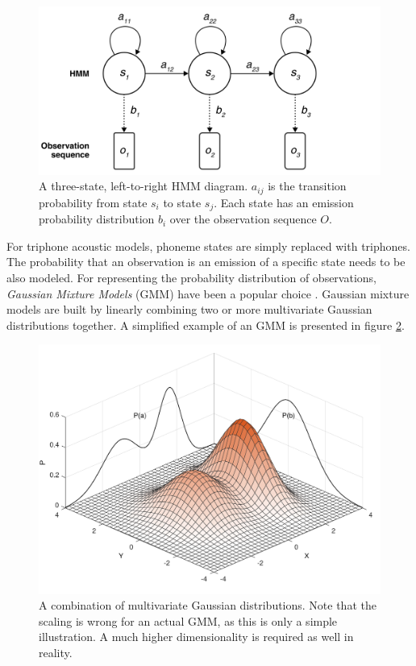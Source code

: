 \documentclass[english, 12pt, a4paper, pdftex, elec, utf8]{aaltothesis}
\begin{document}
\begin{figure}[h!]
	\centering
	\includegraphics[width=\textwidth]{hmm.pdf}
	\caption{A three-state, left-to-right HMM diagram. $a_{ij}$ is the transition probability from state $s_i$ to state $s_j$. Each state has an emission probability distribution $b_i$ over the observation sequence $O$.}
	\label{fig:hmm} 
\end{figure}
For triphone acoustic models, phoneme states are simply replaced with triphones. The probability that an observation is an emission of a specific state needs to be also modeled. For representing the probability distribution of observations, \textit{Gaussian Mixture Models} (GMM) have been a popular choice \cite{gales2008application, hinton2012deep}. Gaussian mixture models are built by linearly combining two or more multivariate Gaussian distributions together. A simplified example of an GMM is presented in figure \ref{fig:gmm}.
\begin{figure}[b]
	\centering
	\includegraphics[trim={0cm 0.2cm 0cm 0.2cm}, clip, width=\textwidth]{gmm.pdf}
	\caption{A combination of multivariate Gaussian distributions. Note that the scaling is wrong for an actual GMM, as this is only a simple illustration. A much higher dimensionality is required as well in reality.}
	\label{fig:gmm} 
\end{figure} \\\\
\end{document}
